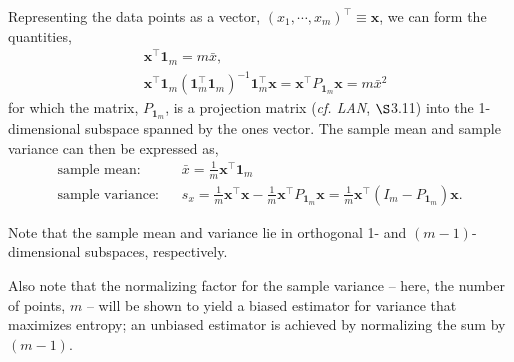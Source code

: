 \documentclass[12pt, twoside, draft]{article}
\begin{document}
Representing the data points as a vector, $(x_1, \cdots, x_m)^\top \equiv \mathbf{x}$, we can form the quantities,
\begin{align}
&\mathbf{x}^\top \mathbf{1}_m = m \bar{x}, \\
&\mathbf{x}^\top \mathbf{1}_m (\mathbf{1}_m^\top \mathbf{1}_m)^{-1} \mathbf{1}_m^\top \mathbf{x} = \mathbf{x}^\top P_{\mathbf{1}_m} \mathbf{x} = m \bar{x}^2
\end{align}
for which the matrix, $ P_{\mathbf{1}_m}$, is a projection matrix (\textit{cf. LAN}, $\S$3.11) into the 1-dimensional subspace spanned by the ones vector.  The sample mean and sample variance can then be expressed as,
\begin{align}
\text{sample mean:} \hspace{10pt} & \bar{x} = \frac{1}{m} \mathbf{x}^\top \mathbf{1}_m \label{eq:sample_mean_single-variate} \\
\text{sample variance:} \hspace{10pt} & s_x = \frac{1}{m}  \mathbf{x}^\top \mathbf{x} -  \frac{1}{m} \mathbf{x}^\top P_{\mathbf{1}_m} \mathbf{x} = \frac{1}{m} \mathbf{x}^\top (I_m -  P_{\mathbf{1}_m}) \mathbf{x} \label{eq:sample_variance_single-variate}.
\end{align}

Note that the sample mean and variance lie in orthogonal 1- and $(m-1)$-dimensional subspaces, respectively. 

Also note that the normalizing factor for the sample variance -- here, the number of points, $m$ --  will be shown to yield a biased estimator for variance that maximizes entropy; an unbiased estimator is achieved by normalizing the sum by $(m-1)$.
\end{document}
